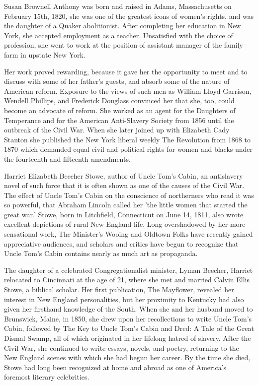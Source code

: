 \documentclass[a4paper]{article}
\begin{document}
Susan Brownell Anthony was born and raised in Adams, Massachusetts on February 15th, 1820, she was one of the greatest icons of women's rights, and was the daughter of a Quaker abolitionist. After completing her education in New York, she accepted employment as a teacher. Unsatisfied with the choice of profession, she went to work at the position of assistant manager of the family farm in upstate New York.

Her work proved rewarding, because it gave her the opportunity to meet and to discuss with some of her father's guests, and absorb some of the nature of American reform. Exposure to the views of such men as William Lloyd Garrison, Wendell Phillips, and Frederick Douglass convinced her that she, too, could become an advocate of reform. She worked as an agent for the Daughters of Temperance and for the American Anti-Slavery Society from 1856 until the outbreak of the Civil War. When she later joined up with Elizabeth Cady Stanton she published the New York liberal weekly The Revolution from 1868 to 1870 which demanded equal civil and political rights for women and blacks under the fourteenth and fifteenth amendments.

Harriet Elizabeth Beecher Stowe, author of Uncle Tom's Cabin, an antislavery novel of such force that it is often shown as one of the causes of the Civil War. The effect of Uncle Tom's Cabin on the conscience of northerners who read it was so powerful, that Abraham Lincoln called her 'the little women that started the great war.' Stowe, born in Litchfield, Connecticut on June 14, 1811, also wrote excellent depictions of rural New England life. Long overshadowed by her more sensational work, The Minister's Wooing and Oldtown Folks have recently gained appreciative audiences, and scholars and critics have begun to recognize that Uncle Tom's Cabin contains nearly as much art as propaganda.

The daughter of a celebrated Congregationalist minister, Lyman Beecher, Harriet relocated to Cincinnati at the age of 21, where she met and married Calvin Ellis Stowe, a biblical scholar. Her first publication, The Mayflower, revealed her interest in New England personalities, but her proximity to Kentucky had also given her firsthand knowledge of the South. When she and her husband moved to Brunswick, Maine, in 1850, she drew upon her recollections to write Uncle Tom's Cabin, followed by The Key to Uncle Tom's Cabin and Dred: A Tale of the Great Dismal Swamp, all of which originated in her lifelong hatred of slavery. After the Civil War, she continued to write essays, novels, and poetry, returning to the New England scenes with which she had begun her career. By the time she died, Stowe had long been recognized at home and abroad as one of America's foremost literary celebrities.
\end{document}
